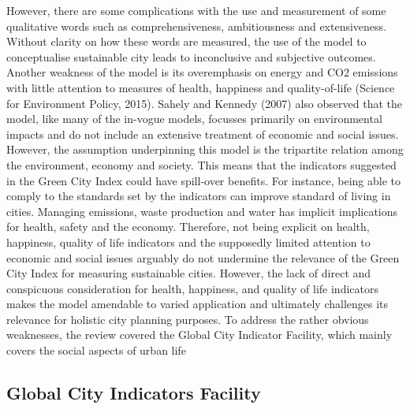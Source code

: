 However, there are some complications with the use and measurement of some qualitative words such as comprehensiveness, ambitiousness and extensiveness. Without clarity on how these words are measured, the use of the model to conceptualise sustainable city leads to inconclusive and subjective outcomes. Another weakness of the model is its overemphasis on energy and CO2 emissions with little attention to measures of health, happiness and quality-of-life (Science for Environment Policy, 2015). Sahely and Kennedy (2007) also observed that the model, like many of the in-vogue models, focusses primarily on environmental impacts and do not include an extensive treatment of economic and social issues. However, the assumption underpinning this model is the tripartite relation among the environment, economy and society. This means that the indicators suggested in the Green City Index could have spill-over benefits. For instance, being able to comply to the standards set by the indicators can improve standard of living in cities. Managing emissions, waste production and water has implicit implications for health, safety and the economy. Therefore, not being explicit on health, happiness, quality of life indicators and the supposedly limited attention to economic and social issues arguably do not undermine the relevance of the Green City Index for measuring sustainable cities. However, the lack of direct and conspicuous consideration for health, happiness, and quality of life indicators makes the model amendable to varied application and ultimately challenges its relevance for holistic city planning purposes. To address the rather obvious weaknesses, the review covered the Global City Indicator Facility, which mainly covers the social aspects of urban life

\subsection{Global City Indicators Facility}

